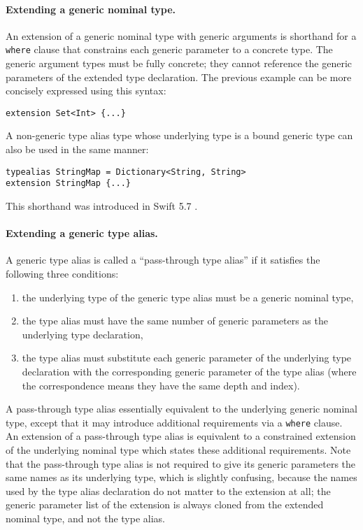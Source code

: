 \documentclass[../generics]{subfiles}
\begin{document}
\paragraph{Extending a generic nominal type.} An extension of a generic nominal type with generic arguments is shorthand for a \texttt{where} clause that constrains each generic parameter to a concrete type. The generic argument types must be fully concrete; they cannot reference the generic parameters of the extended type declaration. The previous example can be more concisely expressed using this syntax:
\begin{Verbatim}
extension Set<Int> {...}
\end{Verbatim}
A non-generic type alias type whose underlying type is a bound generic type can also be used in the same manner:
\begin{Verbatim}
typealias StringMap = Dictionary<String, String>
extension StringMap {...}
\end{Verbatim}
This shorthand was introduced in Swift 5.7 \cite{se0361}.

\paragraph{Extending a generic type alias.}
A generic type alias is called a ``pass-through type alias'' if it satisfies the following three conditions:
\begin{enumerate}
\item the underlying type of the generic type alias must be a generic nominal type,
\item the type alias must have the same number of generic parameters as the underlying type declaration,
\item the type alias must substitute each generic parameter of the underlying type declaration with the corresponding generic parameter of the type alias (where the correspondence means they have the same depth and index).
\end{enumerate}
A pass-through type alias essentially equivalent to the underlying generic nominal type, except that it may introduce additional requirements via a \texttt{where} clause. An extension of a pass-through type alias is equivalent to a constrained extension of the underlying nominal type which states these additional requirements. Note that the pass-through type alias is not required to give its generic parameters the same names as its underlying type, which is slightly confusing, because the names used by the type alias declaration do not matter to the extension at all; the generic parameter list of the extension is always cloned from the extended nominal type, and not the type alias.
\end{document}
